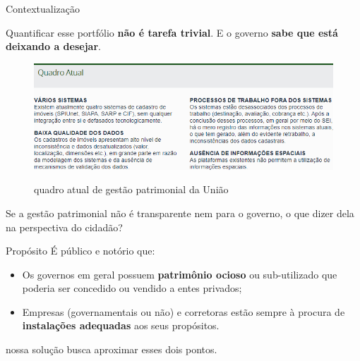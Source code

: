 \documentclass[10pt]{beamer}
\begin{document}
\begin{frame}[fragile]{Contextualização}

    Quantificar esse portfólio \textbf{não é tarefa trivial}. E o governo \textbf{sabe que está deixando a desejar}.
    
    \begin{figure}
        \centering
        \caption{quadro atual de gestão patrimonial da União}
        \includegraphics[width=\linewidth]{demo/images/planejamento_sistema_multiply.png}
        \label{fig:noticia2}
    \end{figure}
    
\end{frame}

\begin{frame}[standout]
  Se a gestão patrimonial não é transparente nem para o governo, o que dizer dela na perspectiva do cidadão?
\end{frame}

\begin{frame}{Propósito}
    É público e notório que:
    
    \begin{itemize}
        \item<+-> Os governos em geral possuem \textbf{patrimônio ocioso} ou sub-utilizado que poderia ser concedido ou vendido a entes privados;
        \item<+-> Empresas (governamentais ou não) e corretoras estão sempre à procura de \textbf{instalações adequadas} aos seus propósitos.
    \end{itemize}
    
	nossa solução busca aproximar esses dois pontos.
\end{frame}
\end{document}
